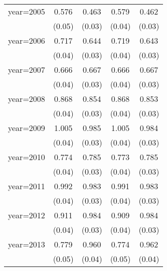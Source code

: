 {\begin{tabular}{l*{4}{c}}
year=2005           &       0.576\sym{***}&       0.463\sym{***}&       0.579\sym{***}&       0.462\sym{***}\\
                    &      (0.05)         &      (0.03)         &      (0.04)         &      (0.03)         \\
year=2006           &       0.717\sym{***}&       0.644\sym{***}&       0.719\sym{***}&       0.643\sym{***}\\
                    &      (0.04)         &      (0.03)         &      (0.04)         &      (0.03)         \\
year=2007           &       0.666\sym{***}&       0.667\sym{***}&       0.666\sym{***}&       0.667\sym{***}\\
                    &      (0.04)         &      (0.03)         &      (0.04)         &      (0.03)         \\
year=2008           &       0.868\sym{***}&       0.854\sym{***}&       0.868\sym{***}&       0.853\sym{***}\\
                    &      (0.04)         &      (0.03)         &      (0.04)         &      (0.03)         \\
year=2009           &       1.005\sym{***}&       0.985\sym{***}&       1.005\sym{***}&       0.984\sym{***}\\
                    &      (0.04)         &      (0.03)         &      (0.04)         &      (0.03)         \\
year=2010           &       0.774\sym{***}&       0.785\sym{***}&       0.773\sym{***}&       0.785\sym{***}\\
                    &      (0.04)         &      (0.03)         &      (0.04)         &      (0.03)         \\
year=2011           &       0.992\sym{***}&       0.983\sym{***}&       0.991\sym{***}&       0.983\sym{***}\\
                    &      (0.04)         &      (0.03)         &      (0.04)         &      (0.03)         \\
year=2012           &       0.911\sym{***}&       0.984\sym{***}&       0.909\sym{***}&       0.984\sym{***}\\
                    &      (0.04)         &      (0.03)         &      (0.04)         &      (0.03)         \\
year=2013           &       0.779\sym{***}&       0.960\sym{***}&       0.774\sym{***}&       0.962\sym{***}\\
                    &      (0.05)         &      (0.04)         &      (0.05)         &      (0.04)         \\

\end{tabular}}
